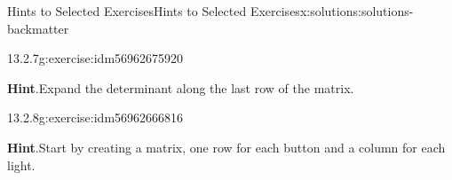 \documentclass[twoside,10pt,]{book}
\newcommand{\blocktitlefont}{\relax}
\numberwithin{equation}{section}
\begin{document}
\begin{solutions-chapter}{Hints  to Selected Exercises}{}{Hints  to Selected Exercises}{}{}{x:solutions:solutions-backmatter}
\begin{divisionsolution}{13.2.7}{}{g:exercise:idm56962675920}
\par\smallskip%
\noindent\textbf{\blocktitlefont Hint}.\hypertarget{g:hint:idm56962675152-back}{}\quad{}Expand the determinant along the last row of the matrix.%
\end{divisionsolution}%
\begin{divisionsolution}{13.2.8}{}{g:exercise:idm56962666816}%
\par\smallskip%
\noindent\textbf{\blocktitlefont Hint}.\hypertarget{g:hint:idm56962663888-back}{}\quad{}Start by creating a matrix, one row for each button and a column for each light.%
\end{divisionsolution}%
\end{solutions-chapter}
%
%
\typeout{************************************************}
\typeout{************************************************}
%
\end{document}
